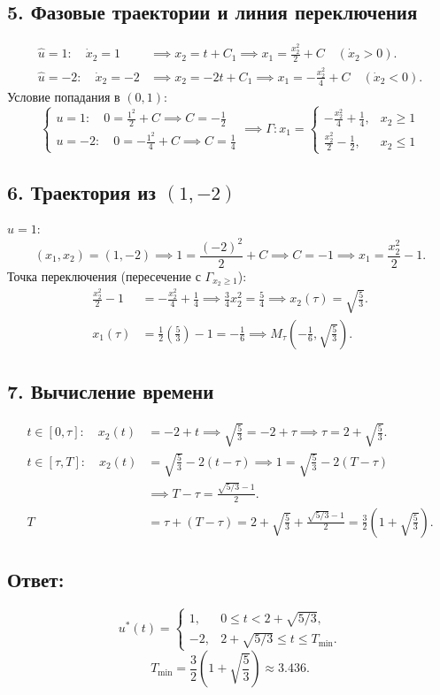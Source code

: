 \documentclass[12pt]{article}
\begin{document}
\subsection*{5. Фазовые траектории и линия переключения}
\begin{align*}
\hat{u}=1: \quad \dot{x}_2 = 1 &\implies x_2 = t + C_1 \implies x_1 = \frac{x_2^2}{2} + C \quad (\dot{x}_2 > 0). \\
\hat{u}=-2: \quad \dot{x}_2 = -2 &\implies x_2 = -2t + C_1 \implies x_1 = -\frac{x_2^2}{4} + C \quad (\dot{x}_2 < 0).
\end{align*}
Условие попадания в \((0,1)\):
\[
\begin{cases} 
u=1: \quad 0 = \frac{1^2}{2} + C \implies C = -\frac{1}{2} \\ 
u=-2: \quad 0 = -\frac{1^2}{4} + C \implies C = \frac{1}{4} 
\end{cases}
\implies \Gamma: x_1 = \begin{cases} 
-\frac{x_2^2}{4} + \frac{1}{4}, & x_2 \ge 1 \\ 
\frac{x_2^2}{2} - \frac{1}{2}, & x_2 \le 1 
\end{cases}
\]

\subsection*{6. Траектория из \((1, -2)\)}

\(u=1\):
\[
(x_1, x_2) = (1, -2) \implies 1 = \frac{(-2)^2}{2} + C \implies C = -1 \implies x_1 = \frac{x_2^2}{2} - 1.
\]
Точка переключения (пересечение с \(\Gamma_{x_2 \ge 1}\)):
\begin{align*}
\frac{x_2^2}{2} - 1 &= -\frac{x_2^2}{4} + \frac{1}{4} \implies \frac{3}{4}x_2^2 = \frac{5}{4} \implies x_2(\tau) = \sqrt{\frac{5}{3}}. \\
x_1(\tau) &= \frac{1}{2}\left(\frac{5}{3}\right) - 1 = -\frac{1}{6} \implies M_\tau \left( -\frac{1}{6}, \sqrt{\frac{5}{3}} \right).
\end{align*}

\subsection*{7. Вычисление времени}
\begin{align*}
t \in [0, \tau]: \quad x_2(t) &= -2 + t \implies \sqrt{\frac{5}{3}} = -2 + \tau \implies \tau = 2 + \sqrt{\frac{5}{3}}. \\
t \in [\tau, T]: \quad x_2(t) &= \sqrt{\frac{5}{3}} - 2(t - \tau) \implies 1 = \sqrt{\frac{5}{3}} - 2(T - \tau) \\
&\implies T - \tau = \frac{\sqrt{5/3} - 1}{2}. \\
T &= \tau + (T - \tau) = 2 + \sqrt{\frac{5}{3}} + \frac{\sqrt{5/3} - 1}{2} = \frac{3}{2}\left(1 + \sqrt{\frac{5}{3}}\right).
\end{align*}

\subsection*{Ответ:}
\[
u^*(t) = \begin{cases} 
1, & 0 \le t < 2 + \sqrt{5/3}, \\
-2, & 2 + \sqrt{5/3} \le t \le T_{\min}.
\end{cases}
\]
\[
T_{\min} = \frac{3}{2}\left(1 + \sqrt{\frac{5}{3}}\right) \approx 3.436.
\]
\end{document}
